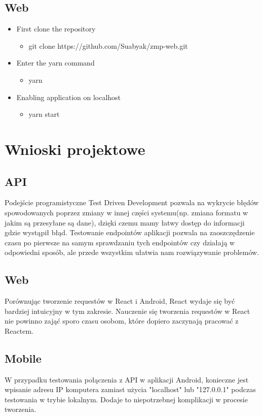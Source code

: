 \documentclass{article}
\begin{document}
\subsection{Web}

\begin{itemize}
    \item First clone the repository
    \begin{itemize}
        \item  git clone https://github.com/Suabyak/zmp-web.git
    \end{itemize}
    \item Enter the yarn command
    \begin{itemize}
        \item  yarn
    \end{itemize}
    \item Enabling application on localhost
    \begin{itemize}
        \item  yarn start
    \end{itemize}

\end{itemize}

\section{Wnioski projektowe}
\subsection{API}
Podejście programistyczne Test Driven Development pozwala na wykrycie błędów spowodowanych poprzez zmiany w innej części systemu(np. zmiana formatu w jakim są przesyłane są dane), dzięki czemu mamy łatwy dostęp do informacji gdzie wystąpił błąd. Testowanie endpointów aplikacji pozwala na zaoszczędzenie czasu po pierwsze na samym sprawdzaniu tych endpointów czy działają w odpowiedni sposób, ale przede wszystkim ułatwia nam rozwiązywanie problemów.
\subsection{Web}
Porównując tworzenie requestów w React i Android, React wydaje się być bardziej intuicyjny w tym zakresie. Nauczenie się tworzenia requestów w React nie powinno zająć sporo czasu osobom, które dopiero zaczynają pracować z Reactem.
\subsection{Mobile}
W przypadku testowania połączenia z API w aplikacji Android, konieczne jest wpisanie adresu IP komputera zamiast użycia "localhost" lub "127.0.0.1" podczas testowania w trybie lokalnym. Dodaje to niepotrzebnej komplikacji w procesie tworzenia.
\end{document}
